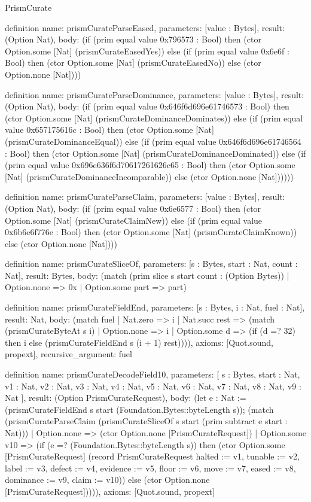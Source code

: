 \begin{lexlean}{PrismCurate}
\begin{semanticmodule}
definition{
  name: prismCurateParseEased,
  parameters: [value : Bytes],
  result: (Option Nat),
  body: (if (prim equal value 0x796573 : Bool) then (ctor Option.some [Nat] (prismCurateEasedYes)) else (if (prim equal value 0x6e6f : Bool) then (ctor Option.some [Nat] (prismCurateEasedNo)) else (ctor Option.none [Nat])))
}

definition{
  name: prismCurateParseDominance,
  parameters: [value : Bytes],
  result: (Option Nat),
  body: (if (prim equal value 0x646f6d696e61746573 : Bool) then (ctor Option.some [Nat] (prismCurateDominanceDominates)) else (if (prim equal value 0x657175616c : Bool) then (ctor Option.some [Nat] (prismCurateDominanceEqual)) else (if (prim equal value 0x646f6d696e61746564 : Bool) then (ctor Option.some [Nat] (prismCurateDominanceDominated)) else (if (prim equal value 0x696e636f6d70617261626c65 : Bool) then (ctor Option.some [Nat] (prismCurateDominanceIncomparable)) else (ctor Option.none [Nat])))))
}

definition{
  name: prismCurateParseClaim,
  parameters: [value : Bytes],
  result: (Option Nat),
  body: (if (prim equal value 0x6e6577 : Bool) then (ctor Option.some [Nat] (prismCurateClaimNew)) else (if (prim equal value 0x6b6e6f776e : Bool) then (ctor Option.some [Nat] (prismCurateClaimKnown)) else (ctor Option.none [Nat])))
}

definition{
  name: prismCurateSliceOf,
  parameters: [s : Bytes, start : Nat, count : Nat],
  result: Bytes,
  body: (match (prim slice s start count : (Option Bytes))
    | Option.none => 0x
    | Option.some part => part)
}

definition{
  name: prismCurateFieldEnd,
  parameters: [s : Bytes, i : Nat, fuel : Nat],
  result: Nat,
  body: (match fuel
    | Nat.zero => i
    | Nat.succ rest => (match (prismCurateByteAt s i)
      | Option.none => i
      | Option.some d => (if (d =? 32) then i else (prismCurateFieldEnd s (i + 1) rest)))),
  axioms: [Quot.sound, propext],
  recursive_argument: fuel
}

definition{
  name: prismCurateDecodeField10,
  parameters: [
    s : Bytes,
    start : Nat,
    v1 : Nat,
    v2 : Nat,
    v3 : Nat,
    v4 : Nat,
    v5 : Nat,
    v6 : Nat,
    v7 : Nat,
    v8 : Nat,
    v9 : Nat
  ],
  result: (Option PrismCurateRequest),
  body: (let e : Nat := (prismCurateFieldEnd s start (Foundation.Bytes::byteLength s)); (match (prismCurateParseClaim (prismCurateSliceOf s start (prim subtract e start : Nat)))
    | Option.none => (ctor Option.none [PrismCurateRequest])
    | Option.some v10 => (if (e =? (Foundation.Bytes::byteLength s)) then (ctor Option.some [PrismCurateRequest] (record PrismCurateRequest {halted := v1, tunable := v2, label := v3, defect := v4, evidence := v5, floor := v6, move := v7, eased := v8, dominance := v9, claim := v10})) else (ctor Option.none [PrismCurateRequest])))),
  axioms: [Quot.sound, propext]
}


\end{semanticmodule}
\end{lexlean}
